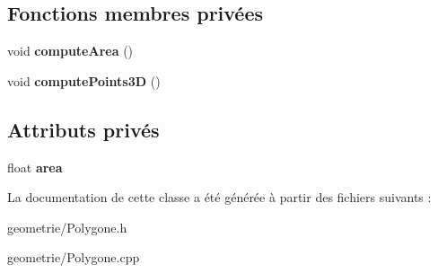 \subsection*{Fonctions membres privées}
\begin{DoxyCompactItemize}
\item 
\hypertarget{class_polygone_a009cdd0ff15c1e3acb0f3ac0be923098}{void {\bfseries compute\-Area} ()}\label{class_polygone_a009cdd0ff15c1e3acb0f3ac0be923098}

\item 
\hypertarget{class_polygone_a77a0710f3deb3b56edbc636ad0f0f05a}{void {\bfseries compute\-Points3\-D} ()}\label{class_polygone_a77a0710f3deb3b56edbc636ad0f0f05a}

\end{DoxyCompactItemize}
\subsection*{Attributs privés}
\begin{DoxyCompactItemize}
\item 
\hypertarget{class_polygone_a3e5934d9c56435df7de0ae97bb8e493d}{float {\bfseries area}}\label{class_polygone_a3e5934d9c56435df7de0ae97bb8e493d}

\end{DoxyCompactItemize}


La documentation de cette classe a été générée à partir des fichiers suivants \-:\begin{DoxyCompactItemize}
\item 
geometrie/Polygone.\-h\item 
geometrie/Polygone.\-cpp\end{DoxyCompactItemize}
